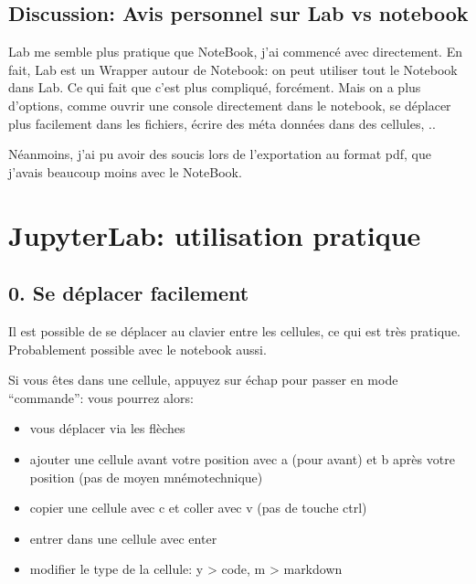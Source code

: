\documentclass[letterpaper,10pt,english]{sphinxmanual}
\begin{document}
\subsection{Discussion: Avis personnel sur Lab vs notebook}
\label{\detokenize{Part1/NoteBookTuto:discussion-avis-personnel-sur-lab-vs-notebook}}
Lab me semble plus pratique que NoteBook, j’ai commencé avec directement. En fait, Lab est un Wrapper autour de Notebook: on peut utiliser tout le Notebook dans Lab. Ce qui fait que c’est plus compliqué, forcément. Mais on a plus d’options, comme ouvrir une console directement dans le notebook, se déplacer plus facilement dans les fichiers, écrire des méta données dans des cellules, ..

Néanmoins, j’ai pu avoir des soucis lors de l’exportation au format pdf, que j’avais beaucoup moins avec le NoteBook.


\section{JupyterLab: utilisation pratique}
\label{\detokenize{Part1/NoteBookTuto:jupyterlab-utilisation-pratique}}

\subsection{0. Se déplacer facilement}
\label{\detokenize{Part1/NoteBookTuto:se-deplacer-facilement}}
Il est possible de se déplacer au clavier entre les cellules, ce qui est très pratique. Probablement possible avec le notebook aussi.

Si vous êtes dans une cellule, appuyez sur échap pour passer en mode “commande”: vous pourrez alors:
\begin{itemize}
\item {} 
vous déplacer via les flèches

\item {} 
ajouter une cellule avant votre position avec a (pour avant) et b après votre position (pas de moyen mnémotechnique)

\item {} 
copier une cellule avec c et coller avec v (pas de touche ctrl)

\item {} 
entrer dans une cellule avec enter

\item {} 
modifier le type de la cellule: y \sphinxhyphen{}> code, m \sphinxhyphen{}> markdown

\end{itemize}
\end{document}
